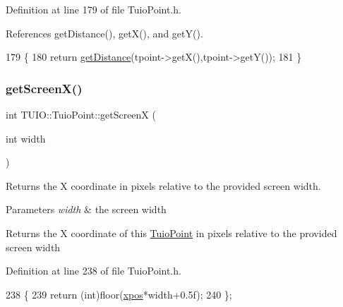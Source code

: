 Definition at line 179 of file Tuio\+Point.\+h.



References get\+Distance(), get\+X(), and get\+Y().


\begin{DoxyCode}
179                                              \{
180             \textcolor{keywordflow}{return} \hyperlink{class_t_u_i_o_1_1_tuio_point_ab73aa4898ec2db72bd64b029473a8069}{getDistance}(tpoint->getX(),tpoint->getY());
181         \}
\end{DoxyCode}
\mbox{\label{class_t_u_i_o_1_1_tuio_point_aad89a76563d49f91412e7795ea7b02d0}} 
\subsubsection{\texorpdfstring{get\+Screen\+X()}{getScreenX()}}
{\footnotesize\ttfamily int T\+U\+I\+O\+::\+Tuio\+Point\+::get\+ScreenX (\begin{DoxyParamCaption}\item[{int}]{width }\end{DoxyParamCaption})\hspace{0.3cm}{\ttfamily [inline]}}

Returns the X coordinate in pixels relative to the provided screen width.


\begin{DoxyParams}{Parameters}
{\em width} & the screen width \\
\hline
\end{DoxyParams}
\begin{DoxyReturn}{Returns}
the X coordinate of this \hyperlink{class_t_u_i_o_1_1_tuio_point}{Tuio\+Point} in pixels relative to the provided screen width 
\end{DoxyReturn}


Definition at line 238 of file Tuio\+Point.\+h.


\begin{DoxyCode}
238                                   \{ 
239             \textcolor{keywordflow}{return} (\textcolor{keywordtype}{int})floor(\hyperlink{class_t_u_i_o_1_1_tuio_point_a0021f8dfddd05f2a17e713a94f5457e6}{xpos}*width+0.5f);
240         \};
\end{DoxyCode}
\mbox{\label{class_t_u_i_o_1_1_tuio_point_aa03a2aae797ad03d5ce272b80c4204bd}} 

